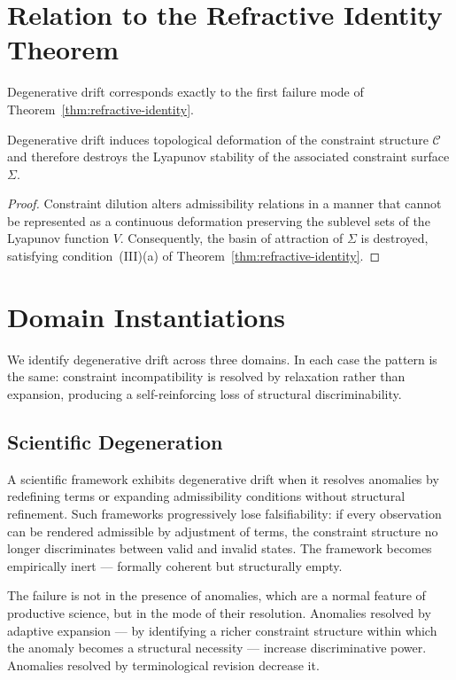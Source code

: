\documentclass[11pt,openany]{book}
\begin{document}
\section{Relation to the Refractive Identity Theorem}
\label{sec:relation-theorem}

Degenerative drift corresponds exactly to the first failure
mode of Theorem~\ref{thm:refractive-identity}.

\begin{proposition}
\label{prop:equivalence}
Degenerative drift induces topological deformation of the
constraint structure $\mathcal{C}$ and therefore destroys
the Lyapunov stability of the associated constraint surface
$\Sigma$.
\end{proposition}

\begin{proof}
Constraint dilution alters admissibility relations in a
manner that cannot be represented as a continuous
deformation preserving the sublevel sets of the Lyapunov
function $V$.  Consequently, the basin of attraction of
$\Sigma$ is destroyed, satisfying condition~(III)(a) of
Theorem~\ref{thm:refractive-identity}.
\end{proof}

\section{Domain Instantiations}
\label{sec:domains}

We identify degenerative drift across three domains.  In
each case the pattern is the same: constraint incompatibility
is resolved by relaxation rather than expansion, producing
a self-reinforcing loss of structural discriminability.

\subsection{Scientific Degeneration}
\label{subsec:scientific}

A scientific framework exhibits degenerative drift when it
resolves anomalies by redefining terms or expanding
admissibility conditions without structural refinement.
Such frameworks progressively lose falsifiability: if every
observation can be rendered admissible by adjustment of
terms, the constraint structure no longer discriminates
between valid and invalid states.  The framework becomes
empirically inert --- formally coherent but structurally
empty.

The failure is not in the presence of anomalies, which are
a normal feature of productive science, but in the mode of
their resolution.  Anomalies resolved by adaptive expansion
--- by identifying a richer constraint structure within
which the anomaly becomes a structural necessity --- increase
discriminative power.  Anomalies resolved by terminological
revision decrease it.
\end{document}
